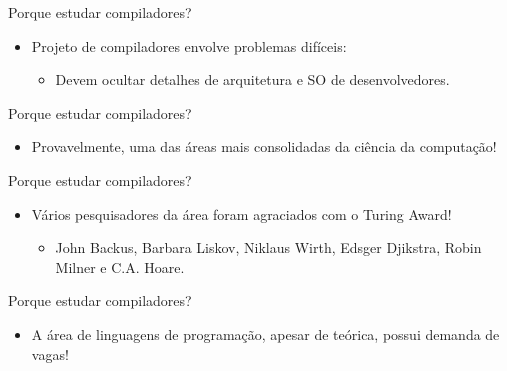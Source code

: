 \begin{frame}{Porque estudar compiladores?}

    \begin{itemize}

        \item
        Projeto de compiladores envolve problemas difíceis:

        \begin{itemize}

            \item
            Devem ocultar detalhes de arquitetura e SO de desenvolvedores.
        \end{itemize}
    \end{itemize}
\end{frame}

\begin{frame}{Porque estudar compiladores?}

    \begin{itemize}

        \item
        Provavelmente, uma das áreas mais consolidadas da ciência da
        computação!
    \end{itemize}
\end{frame}

\begin{frame}{Porque estudar compiladores?}

    \begin{itemize}

        \item
        Vários pesquisadores da área foram agraciados com o Turing Award!

        \begin{itemize}

            \item
            John Backus, Barbara Liskov, Niklaus Wirth, Edsger Djikstra, Robin
            Milner e C.A. Hoare.
        \end{itemize}
    \end{itemize}
\end{frame}

\begin{frame}{Porque estudar compiladores?}

    \begin{itemize}

        \item
        A área de linguagens de programação, apesar de teórica, possui demanda
        de vagas!
    \end{itemize}
\end{frame}

